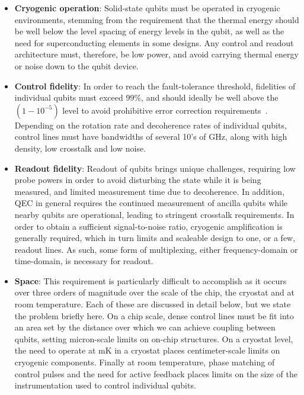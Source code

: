 \begin{itemize}
  \item \textbf{Cryogenic operation}: Solid-state qubits must be operated in cryogenic environments, stemming from the requirement that the thermal energy should be well below the level spacing of energy levels in the qubit, as well as the need for superconducting elements in some designs. Any control and readout architecture must, therefore, be low power, and avoid carrying thermal energy or noise down to the qubit device.
  \item \textbf{Control fidelity}: In order to reach the fault-tolerance threshold, fidelities of individual qubits must exceed $99\%$, and should ideally be well above the $(1 - 10^{-5})$ level to avoid prohibitive error correction requirements~\cite{6657074}. Depending on the rotation rate and decoherence rates of individual qubits, control lines must have bandwidths of several 10's of \si{\giga\hertz}, along with high density, low crosstalk and low noise.
  \item \textbf{Readout fidelity}: Readout of qubits brings unique challenges, requiring low probe powers in order to avoid disturbing the state while it is being measured, and limited measurement time due to decoherence. In addition, QEC in general requires the continued measurement of ancilla qubits while nearby qubits are operational, leading to stringent crosstalk requirements. In order to obtain a sufficient signal-to-noise ratio, cryogenic amplification is generally required, which in turn limits and scaleable design to one, or a few, readout lines. As such, some form of multiplexing, either frequency-domain or time-domain, is necessary for readout.
  \item \textbf{Space}: This requirement is particularly difficult to accomplish as it occurs over three orders of magnitude over the scale of the chip, the cryostat and at room temperature. Each of these are discussed in detail below, but we state the problem briefly here. On a chip scale, dense control lines must be fit into an area set by the distance over which we can achieve coupling between qubits, setting micron-scale limits on on-chip structures. On a cryostat level, the need to operate at \si{\milli\kelvin} in a cryostat places centimeter-scale limits on cryogenic components. Finally at room temperature, phase matching of control pulses and the need for active feedback places limits on the size of the instrumentation used to control individual qubits.
\end{itemize}

